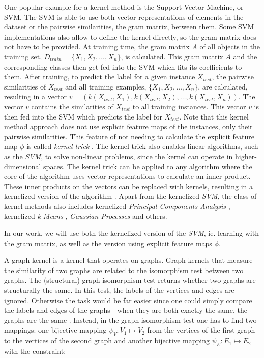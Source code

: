 One popular example for a kernel method is the Support Vector Machine, or SVM.
The SVM is able to use both vector representations of elements in the dataset or the pairwise similarities, the gram matrix, between them.
Some SVM implementations also allow to define the kernel directly, so the gram matrix does not have to be provided.
At training time, the gram matrix $A$ of all objects in the training set, $D_{train} = \{X_1, X_2, \ldots, X_n\}$, is calculated.
This gram matrix $A$ and the corresponding classes then get fed into the SVM which fits its coefficients to them.
After training, to predict the label for a given instance $X_{test}$, the pairwise similarities of $X_{test}$ and all training examples, $\{X_1, X_2, \ldots, X_n\}$, are calculated, resulting in a vector $v = (k(X_{test}, X_1), k(X_{test}, X_2), \ldots, k(X_{test}, X_n))$.
The vector $v$ contains the similarities of $X_{test}$ to all training instances.
This vector $v$ is then fed into the SVM which predicts the label for $X_{test}$.
Note that this kernel method approach does not use explicit feature maps of the instances, only their pairwise similarities.
This feature of not needing to calculate the explicit feature map $\phi$ is called \textit{kernel trick} \cite[p.~292]{Bishop2006}.
The kernel trick also enables linear algorithms, such as the \textit{SVM}, to solve non-linear problems, since the kernel can operate in higher-dimensional spaces.
The kernel trick can be applied to any algorithm where the core of the algorithm uses vector representations to calculate an inner product. These inner products on the vectors can be replaced with kernels, resulting in a kernelized version of the algorithm \cite{Wu}.
Apart from the kernelized \textit{SVM}, the class of kernel methods also includes kernelized \textit{Principal Components Analysis} \cite{Scholkopf1998}, kernelized \textit{k-Means} \cite{Jain2010}, \textit{Gaussian Processes} \cite[p.~303]{Bishop2006} and others.

In our work, we will use both the kernelized version of the \textit{SVM}, ie. learning with the gram matrix, as well as the version using explicit feature maps $\phi$.

A graph kernel is a kernel that operates on graphs.
Graph kernels that measure the similarity of two graphs are related to the isomorphism test \cite[p.~4]{Bondy1976} between two graphs.
The (structural) graph isomorphism test returns whether two graphs are structurally the same.
In this test, the labels of the vertices and edges are ignored. Otherwise the task would be far easier since one could simply compare the labels and edges of the graphs - when they are both exactly the same, the graphs are the same \cite[p.~4]{Bondy1976}.
Instead, in the graph isomorphism test one has to find two mappings: one bijective mapping $\psi_{V}: V_1 \mapsto V_2$ from the vertices of the first graph to the vertices of the second graph and another bijective mapping $\psi_{E}: E_1 \mapsto E_2$ with the constraint:

